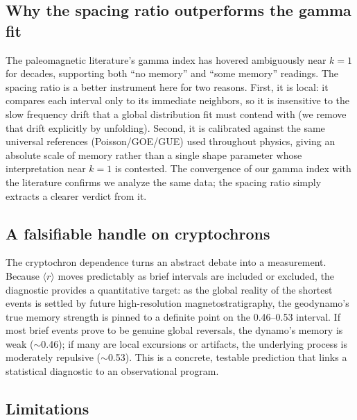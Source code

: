 \documentclass[12pt,a4paper]{article}
\begin{document}
\subsection{Why the spacing ratio outperforms the gamma fit}

The paleomagnetic literature's gamma index has hovered ambiguously near $k=1$ for decades, supporting both ``no memory'' and ``some memory'' readings. The spacing ratio is a better instrument here for two reasons. First, it is local: it compares each interval only to its immediate neighbors, so it is insensitive to the slow frequency drift that a global distribution fit must contend with (we remove that drift explicitly by unfolding). Second, it is calibrated against the same universal references (Poisson/GOE/GUE) used throughout physics, giving an absolute scale of memory rather than a single shape parameter whose interpretation near $k=1$ is contested. The convergence of our gamma index with the literature confirms we analyze the same data; the spacing ratio simply extracts a clearer verdict from it.

\subsection{A falsifiable handle on cryptochrons}

The cryptochron dependence turns an abstract debate into a measurement. Because $\langle r\rangle$ moves predictably as brief intervals are included or excluded, the diagnostic provides a quantitative target: as the global reality of the shortest events is settled by future high-resolution magnetostratigraphy, the geodynamo's true memory strength is pinned to a definite point on the 0.46--0.53 interval. If most brief events prove to be genuine global reversals, the dynamo's memory is weak ($\sim$0.46); if many are local excursions or artifacts, the underlying process is moderately repulsive ($\sim$0.53). This is a concrete, testable prediction that links a statistical diagnostic to an observational program.

\subsection{Limitations}
\end{document}
